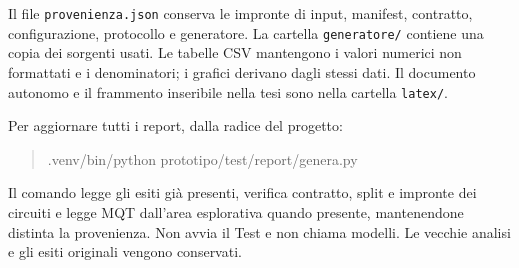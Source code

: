 Il file \texttt{provenienza.json} conserva le impronte di input, manifest, contratto, configurazione, protocollo e generatore. La cartella \texttt{generatore/} contiene una copia dei sorgenti usati. Le tabelle CSV mantengono i valori numerici non formattati e i denominatori; i grafici derivano dagli stessi dati. Il documento autonomo e il frammento inseribile nella tesi sono nella cartella \texttt{latex/}.

Per aggiornare tutti i report, dalla radice del progetto:
\begin{quote}\small\ttfamily .venv/bin/python prototipo/test/report/genera.py\end{quote}
Il comando legge gli esiti già presenti, verifica contratto, split e impronte dei circuiti e legge MQT dall’area esplorativa quando presente, mantenendone distinta la provenienza. Non avvia il Test e non chiama modelli. Le vecchie analisi e gli esiti originali vengono conservati.

